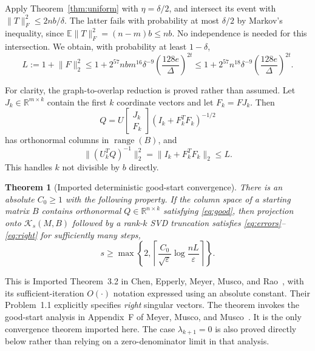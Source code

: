 \documentclass[11pt]{article}
\numberwithin{equation}{section}
\newtheorem{theorem}{Theorem}[section]
\theoremstyle{definition}
\newcommand{\R}{\mathbb R}
\newcommand{\K}{\mathcal K}
\newcommand{\E}{\mathbb E}
\newcommand{\range}{\operatorname{range}}
\newcommand{\nn}[1]{\lVert #1\rVert}
\begin{document}
Apply Theorem~\ref{thm:uniform} with $\eta=\delta/2$, and intersect its event with
$\nn T_F^2\le2nb/\delta$. The latter fails with probability at most $\delta/2$ by Markov's inequality, since $\E\nn T_F^2=(n-m)b\le nb$. No independence is needed for this intersection. We obtain, with probability at least $1-\delta$,
\begin{equation}\label{eq:L}
L:=1+\nn F_2^2
\le1+2^{57}nbm^{16}\delta^{-9}\left(\frac{128e}{\Delta}\right)^{2t}
\le1+2^{57}n^{18}\delta^{-9}\left(\frac{128e}{\Delta}\right)^{2t}.
\end{equation}

For clarity, the graph-to-overlap reduction is proved rather than assumed. Let $J_k\in\R^{m\times k}$ contain the first $k$ coordinate vectors and let $F_k=FJ_k$. Then
\[
Q=U\begin{bmatrix}J_k\\F_k\end{bmatrix}(I_k+F_k^TF_k)^{-1/2}
\]
has orthonormal columns in $\range(B)$, and
\begin{equation}\label{eq:good}
\nn{(U_k^TQ)^{-1}}_2^2
=\nn{I_k+F_k^TF_k}_2\le L.
\end{equation}
This handles $k$ not divisible by $b$ directly.

\begin{theorem}[Imported deterministic good-start convergence]\label{thm:imported}
There is an absolute $C_0\ge1$ with the following property. If the column space of a starting matrix $B$ contains orthonormal $Q\in\R^{n\times k}$ satisfying \eqref{eq:good}, then projection onto $\K_s(M,B)$ followed by a rank-$k$ SVD truncation satisfies \eqref{eq:errors}--\eqref{eq:right} for sufficiently many steps,
\[
s\ge\max\left\{2,\left\lceil\frac{C_0}{\sqrt\varepsilon}\log\frac{nL}{\varepsilon}\right\rceil\right\}.
\]
\end{theorem}

This is Imported Theorem~3.2 in Chen, Epperly, Meyer, Musco, and Rao~\cite{chen}, with its sufficient-iteration $O(\cdot)$ notation expressed using an absolute constant. Their Problem~1.1 explicitly specifies \emph{right} singular vectors. The theorem invokes the good-start analysis in Appendix~F of Meyer, Musco, and Musco~\cite{mmm}. It is the only convergence theorem imported here. The case $\lambda_{k+1}=0$ is also proved directly below rather than relying on a zero-denominator limit in that analysis.
\end{document}

